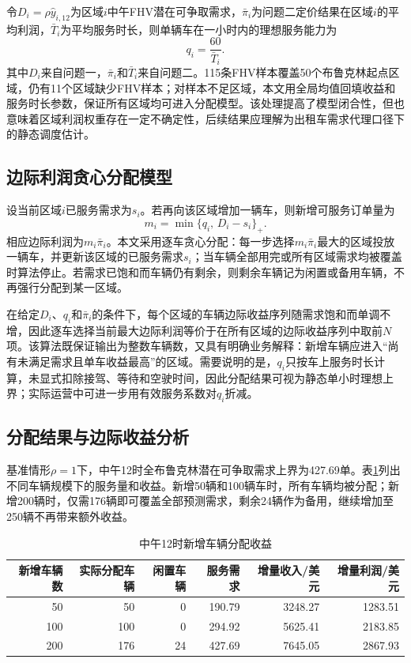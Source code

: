 \documentclass[UTF8,a4paper,12pt]{ctexart}
\begin{document}
令$D_i=\rho\hat{y}_{i,12}$为区域$i$中午FHV潜在可争取需求，$\bar{\pi}_i$为问题二定价结果在区域$i$的平均利润，$\bar{T}_i$为平均服务时长，则单辆车在一小时内的理想服务能力为
\begin{equation}
    q_i=\frac{60}{\bar{T}_i}.
\end{equation}
其中$D_i$来自问题一，$\bar{\pi}_i$和$\bar{T}_i$来自问题二。115条FHV样本覆盖50个布鲁克林起点区域，仍有11个区域缺少FHV样本；对样本不足区域，本文用全局均值回填收益和服务时长参数，保证所有区域均可进入分配模型。该处理提高了模型闭合性，但也意味着区域利润权重存在一定不确定性，后续结果应理解为出租车需求代理口径下的静态调度估计。

\subsection{边际利润贪心分配模型}
设当前区域$i$已服务需求为$s_i$。若再向该区域增加一辆车，则新增可服务订单量为
\begin{equation}
    m_i=\min\{q_i,\,D_i-s_i\}_{+}.
\end{equation}
相应边际利润为$m_i\bar{\pi}_i$。本文采用逐车贪心分配：每一步选择$m_i\bar{\pi}_i$最大的区域投放一辆车，并更新该区域的已服务需求$s_i$；当车辆全部用完或所有区域需求均被覆盖时算法停止。若需求已饱和而车辆仍有剩余，则剩余车辆记为闲置或备用车辆，不再强行分配到某一区域。

在给定$D_i$、$q_i$和$\bar{\pi}_i$的条件下，每个区域的车辆边际收益序列随需求饱和而单调不增，因此逐车选择当前最大边际利润等价于在所有区域的边际收益序列中取前$N$项。该算法既保证输出为整数车辆数，又具有明确业务解释：新增车辆应进入“尚有未满足需求且单车收益最高”的区域。需要说明的是，$q_i$只按车上服务时长计算，未显式扣除接驾、等待和空驶时间，因此分配结果可视为静态单小时理想上界；实际运营中可进一步用有效服务系数对$q_i$折减。

\subsection{分配结果与边际收益分析}
基准情形$\rho=1$下，中午12时全布鲁克林潜在可争取需求上界为427.69单。表\ref{tab:q3_summary}列出不同车辆规模下的服务量和收益。新增50辆和100辆车时，所有车辆均被分配；新增200辆时，仅需176辆即可覆盖全部预测需求，剩余24辆作为备用，继续增加至250辆不再带来额外收益。

\begin{table}[H]
\centering
\caption{中午12时新增车辆分配收益}
\label{tab:q3_summary}
\begin{tabular}{rrrrrr}
\toprule
新增车辆数 & 实际分配车辆 & 闲置车辆 & 服务需求 & 增量收入/美元 & 增量利润/美元 \\
\midrule
50 & 50 & 0 & 190.79 & 3248.27 & 1283.51 \\
100 & 100 & 0 & 294.92 & 5625.41 & 2183.85 \\
200 & 176 & 24 & 427.69 & 7645.05 & 2867.93 \\
\bottomrule
\end{tabular}
\end{table}
\end{document}
